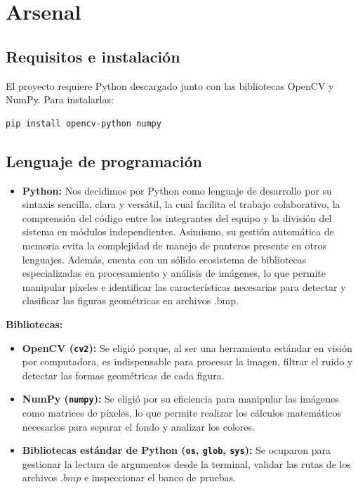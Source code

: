 \documentclass[11pt]{article}
\begin{document}
\section{Arsenal}

\subsection{Requisitos e instalación}
El proyecto requiere Python descargado junto con las bibliotecas OpenCV y NumPy.
Para instalarlas:

\begin{lstlisting}
pip install opencv-python numpy
\end{lstlisting}


\subsection{Lenguaje de programación}

\begin{itemize}
    \item \textbf{Python:} Nos decidimos por Python  como lenguaje de desarrollo por su sintaxis sencilla, clara y versátil, la cual facilita el trabajo colaborativo, la comprensión del código entre los integrantes del equipo y la división del sistema en módulos independientes. Asimismo, su gestión automática de memoria evita la complejidad de manejo de punteros presente en otros lenguajes. Además, cuenta con un sólido ecosistema de bibliotecas especializadas en procesamiento y análisis de imágenes, lo que permite manipular píxeles e identificar las características necesarias para detectar y clasificar las figuras geométricas en archivos .bmp. 
\end{itemize}

\textbf{Bibliotecas:}
\begin{itemize}
    \item \textbf{OpenCV (\texttt{cv2}):} Se eligió porque, al ser una herramienta estándar en visión por computadora, es indispensable para procesar la imagen, filtrar el ruido y detectar las formas geométricas de cada figura.
    \item \textbf{NumPy (\texttt{numpy}):} Se eligió por su eficiencia para manipular las imágenes como matrices de píxeles, lo que permite realizar los cálculos matemáticos necesarios para separar el fondo y analizar los colores.
    \item \textbf{Bibliotecas estándar de Python (\texttt{os}, \texttt{glob}, \texttt{sys}):} Se ocuparon para gestionar la lectura de argumentos desde la terminal, validar las rutas de los archivos $.bmp$ e inspeccionar el banco de pruebas.
\end{itemize}
\end{document}
